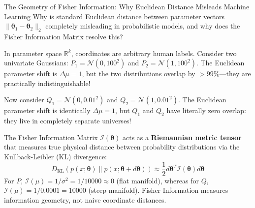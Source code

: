 \begin{ponderbox}{The Geometry of Fisher Information: Why Euclidean Distance Misleads Machine Learning}
Why is standard Euclidean distance between parameter vectors $\|\boldsymbol{\theta}_1 - \boldsymbol{\theta}_2\|_2$ completely misleading in probabilistic models, and why does the Fisher Information Matrix resolve this?

\tcblower
In parameter space $\mathbb{R}^k$, coordinates are arbitrary human labels. Consider two univariate Gaussians: $P_1 = \mathcal{N}(0, 100^2)$ and $P_2 = \mathcal{N}(1, 100^2)$. The Euclidean parameter shift is $\Delta \mu = 1$, but the two distributions overlap by $>99\%$---they are practically indistinguishable!

Now consider $Q_1 = \mathcal{N}(0, 0.01^2)$ and $Q_2 = \mathcal{N}(1, 0.01^2)$. The Euclidean parameter shift is identically $\Delta \mu = 1$, but $Q_1$ and $Q_2$ have literally zero overlap: they live in completely separate universes!

The Fisher Information Matrix $\mathcal{I}(\boldsymbol{\theta})$ acts as a \textbf{Riemannian metric tensor} that measures true physical distance between probability distributions via the Kullback-Leibler (KL) divergence:
\begin{equation*}
D_{\text{KL}}\left( p(x; \boldsymbol{\theta}) \parallel p(x; \boldsymbol{\theta} + d\boldsymbol{\theta}) \right) \approx \frac{1}{2} d\boldsymbol{\theta}^T \mathcal{I}(\boldsymbol{\theta}) d\boldsymbol{\theta}
\end{equation*}
For $P$, $\mathcal{I}(\mu) = 1/\sigma^2 = 1/10000 \approx 0$ (flat manifold), whereas for $Q$, $\mathcal{I}(\mu) = 1/0.0001 = 10000$ (steep manifold). Fisher Information measures information geometry, not naive coordinate distances.
\end{ponderbox}

